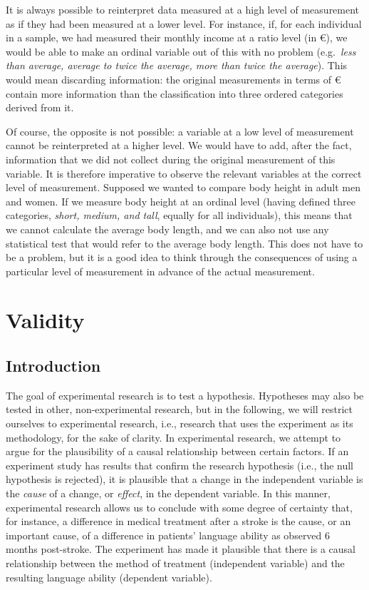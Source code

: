 \documentclass[
]{book}
\begin{document}
It is always possible to reinterpret data measured at a high level of measurement as if they had been measured at a lower level. For instance, if, for each individual in a sample, we had measured their monthly income at a ratio level (in €), we would be able to make an ordinal variable out of this with no problem (e.g.~\emph{less than average, average to twice the average, more than twice the average}). This would mean discarding information: the original measurements in terms of € contain more information than the classification into three ordered categories derived from it.

Of course, the opposite is not possible: a variable at a low level of measurement cannot be reinterpreted at a higher level. We would have to add, after the fact, information that we did not collect during the original measurement of this variable. It is therefore imperative to observe the relevant variables at the correct level of measurement. Supposed we wanted to compare body height in adult men and women. If we measure body height at an ordinal level (having defined three categories, \emph{short, medium, and tall}, equally for all individuals), this means that we cannot calculate the average body length, and we can also not use any statistical test that would refer to the average body length. This does not have to be a problem, but it is a good idea to think through the consequences of using a particular level of measurement in advance of the actual measurement.

\hypertarget{ch:validity}{%
\chapter{Validity}\label{ch:validity}}

\hypertarget{introduction-2}{%
\section{Introduction}\label{introduction-2}}

The goal of experimental research is to test a hypothesis. Hypotheses may also be tested in other, non-experimental research, but in the following, we will restrict ourselves to experimental research, i.e., research that uses the experiment as its methodology, for the sake of clarity. In experimental research, we attempt to argue for the plausibility of a causal relationship between certain factors. If an experiment study has results that confirm the research hypothesis (i.e., the null hypothesis is rejected), it is plausible that a change in the independent variable is the \emph{cause} of a change, or \emph{effect}, in the dependent variable. In this manner, experimental research allows us to conclude with some degree of certainty that, for instance, a difference in medical treatment after a stroke is the cause, or an important cause, of a difference in patients' language ability as observed 6 months post-stroke. The experiment has made it plausible that there is a causal relationship between the method of treatment (independent variable) and the resulting language ability (dependent variable).
\end{document}
